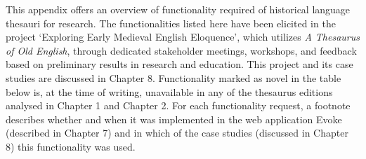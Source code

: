 This appendix offers an overview of functionality required of historical language thesauri for research. The functionalities listed here have been elicited in the project `Exploring Early Medieval English Eloquence', which utilizes \textit{A Thesaurus of Old English}, through dedicated stakeholder meetings, workshops, and feedback based on preliminary results in research and education. This project and its case studies are discussed in Chapter 8. %
Functionality marked as novel in the table below is, at the time of writing, unavailable in any of the thesaurus editions analysed in Chapter 1 and Chapter 2. 
For each functionality request, a footnote describes whether and when it was implemented in the web application Evoke (described in Chapter 7) and in which of the case studies (discussed in Chapter 8) this functionality was used.


